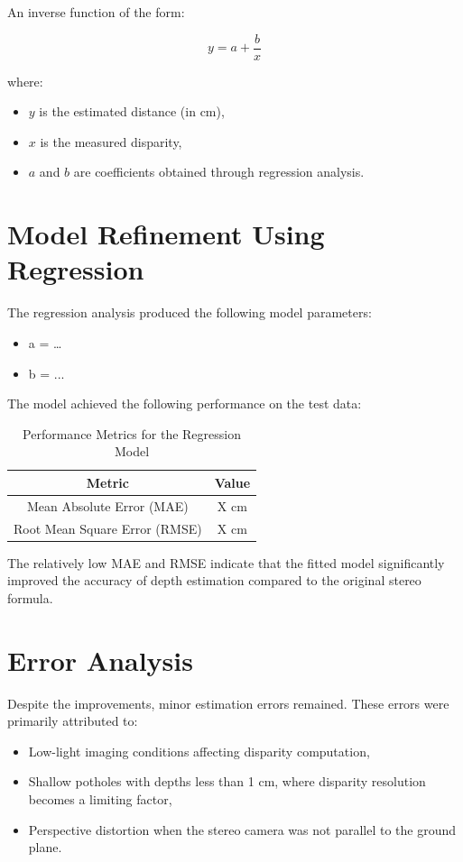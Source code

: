 An inverse function of the form:

\[
y = a + \frac{b}{x}
\]

where:
\begin{itemize}
	\item \( y \) is the estimated distance (in cm),
	\item \( x \) is the measured disparity,
	\item \( a \) and \( b \) are coefficients obtained through regression analysis.
\end{itemize}

\section{Model Refinement Using Regression}
The regression analysis produced the following model parameters:
\begin{itemize}
	\item a = …
	\item b = ...
\end{itemize}

The model achieved the following performance on the test data:

\begin{table}[H]
	\centering
	\begin{tabular}{|c|c|}
		\hline
		\textbf{Metric} & \textbf{Value} \\ \hline
		Mean Absolute Error (MAE) & X cm \\ \hline
		Root Mean Square Error (RMSE) & X cm \\ \hline
	\end{tabular}
	\caption{Performance Metrics for the Regression Model}
	\label{tab:performance_metrics}
\end{table}

The relatively low MAE and RMSE indicate that the fitted model significantly improved the accuracy of depth estimation compared to the original stereo formula.


\section{Error Analysis}
Despite the improvements, minor estimation errors remained. These errors were primarily attributed to:
\begin{itemize}
	\item Low-light imaging conditions affecting disparity computation,
	\item Shallow potholes with depths less than 1 cm, where disparity resolution becomes a limiting factor,
	\item Perspective distortion when the stereo camera was not parallel to the ground plane.
\end{itemize}


